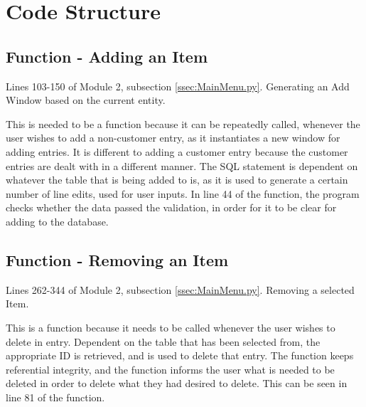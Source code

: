 \section{Code Structure}

\subsection{Function - Adding an Item}
Lines 103-150 of Module 2, subsection \ref{ssec:MainMenu.py}. Generating an Add Window based on the current entity.
\begin{tiny}
\end{tiny}
This is needed to be a function because it can be repeatedly called, whenever the user wishes to add a non-customer entry, as it instantiates a new window for adding entries. It is different to adding a customer entry because the customer entries are dealt with in a different manner. The SQL statement is dependent on whatever the table that is being added to is, as it is used to generate a certain number of line edits, used for user inputs. In line 44 of the function, the program checks whether the data passed the validation, in order for it to be clear for adding to the database.

\subsection{Function - Removing an Item}
Lines 262-344 of Module 2, subsection \ref{ssec:MainMenu.py}. Removing a selected Item.
\begin{tiny}
\end{tiny}
This is a function because it needs to be called whenever the user wishes to delete in entry. Dependent on the table that has been selected from, the appropriate ID is retrieved, and is used to delete that entry. The function keeps referential integrity, and the function informs the user what is needed to be deleted in order to delete what they had desired to delete. This can be seen in line 81 of the function.


